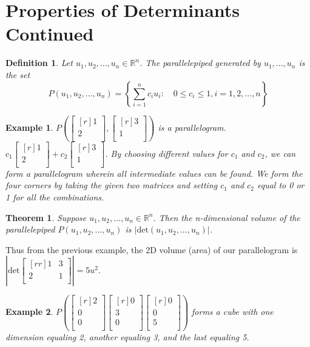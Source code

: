\documentclass{report}
\newtheorem*{ex}{Example}
\newtheorem*{defn}{Definition}
\newtheorem*{thrm}{Theorem}
\begin{document}
\section{Properties of Determinants Continued}
\begin{defn}
Let $u_1,u_2,...,u_n\in\mathbb{R}^n$. The parallelepiped generated by $u_1,...,u_n$ is the set
\[ P(u_1,u_2,...,u_n) = \left\{\sum_{i=1}^n c_iu_i:\quad 0\leq c_i\leq 1,i=1,2,...,n\right\} \]
\end{defn}
\begin{ex}
$P(\begin{bmatrix}[r]1\\2\\\end{bmatrix},\begin{bmatrix}[r]3\\1\\\end{bmatrix})$ is a parallelogram. \\
$c_1\begin{bmatrix}[r]1\\2\\\end{bmatrix}+c_2\begin{bmatrix}[r]3\\1\\\end{bmatrix}$. By choosing different values for $c_1$ and $c_2$, we can form a parallelogram wherein all intermediate values can be found. We form the four corners by taking the given two matrices and setting $c_1$ and $c_2$ equal to 0 or 1 for all the combinations.
\end{ex}
\begin{thrm}
Suppose $u_1,u_2,...,u_n\in\mathbb{R}^n$. Then the n-dimensional volume of the parallelepiped $P(u_1,u_2,...,u_n)$ is $|\mathrm{det}(u_1,u_2,...,u_n)|$.
\end{thrm}
Thus from the previous example, the 2D volume (area) of our parallelogram is $\left |\mathrm{det}\begin{bmatrix}[rr]1&3\\2&1\\\end{bmatrix}\right |=5u^2$.\\
\begin{ex}
$P\left (\begin{bmatrix}[r]2\\0\\0\\\end{bmatrix}\begin{bmatrix}[r]0\\3\\0\\\end{bmatrix}\begin{bmatrix}[r]0\\0\\5\\\end{bmatrix}\right )$ forms a cube with one dimension equaling 2, another equaling 3, and the last equaling 5. \\
\end{ex}
\end{document}
